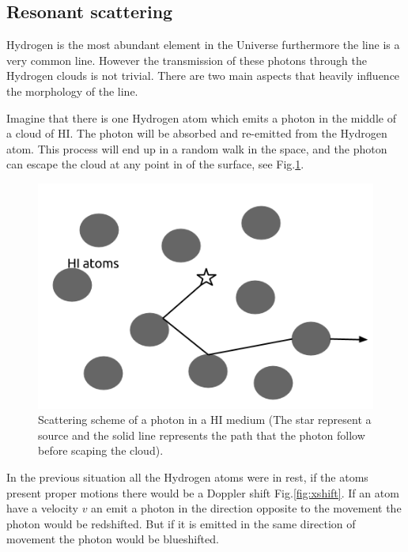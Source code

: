 \subsection{Resonant scattering}\label{sec:resonant}

Hydrogen is the most abundant element in the Universe furthermore
the \ly line is a very common line. However the transmission of these
\ly  photons through the Hydrogen clouds is not trivial. There 
are two main aspects that heavily influence the morphology of the line.

Imagine that there is one Hydrogen atom which emits 
a \ly photon in the middle of a cloud of HI. 
The \ly photon will be absorbed and re-emitted from 
the Hydrogen atom. This process will end up in a random walk in the space,
and the photon can escape the cloud at any point in of the surface, see 
Fig.\ref{fig:rw}.\\

\begin{figure}
\begin{center}
\includegraphics[scale=0.4]{Figures/randomwalk.png}
\end{center}\caption{Scattering scheme of a \ly photon in a HI medium
(The star represent a \ly source and the solid line represents the path that
the \ly photon follow before scaping the cloud).\label{fig:rw}}
\end{figure}


In the previous situation all the Hydrogen atoms were in rest, if the atoms
present proper motions there would be a Doppler shift Fig.\ref{fig:xshift}. 
If an atom have a velocity $v$ an emit a \ly photon in the direction 
opposite to the movement the \ly photon 
would be redshifted. But if it is emitted in the same direction of movement the
\ly photon would be blueshifted.    

